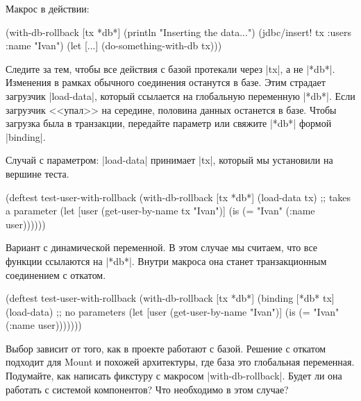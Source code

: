 \noindent
Макрос в действии:

\begin{english}
  \begin{clojure}
(with-db-rollback [tx *db*]
  (println "Inserting the data...")
  (jdbc/insert! tx :users {:name "Ivan"})
  (let [...]
    (do-something-with-db tx)))
  \end{clojure}
\end{english}

Следите за тем, чтобы все действия с базой протекали через \spverb|tx|, а не
\spverb|*db*|. Изменения в рамках обычного соединения останутся в базе. Этим
страдает загрузчик \spverb|load-data|, который ссылается на глобальную
переменную \spverb|*db*|. Если загрузчик <<упал>> на середине, половина данных
останется в базе. Чтобы загрузка была в транзакции, передайте параметр или
свяжите \spverb|*db*| формой \spverb|binding|.

Случай с параметром: \spverb|load-data| принимает \spverb|tx|, который мы
установили на вершине теста.

\begin{english}
  \begin{clojure}
(deftest test-user-with-rollback
  (with-db-rollback [tx *db*]
    (load-data tx) ;; takes a parameter
    (let [user (get-user-by-name tx "Ivan")]
      (is (= "Ivan" (:name user))))))
  \end{clojure}
\end{english}


Вариант с динамической переменной. В этом случае мы считаем, что все функции
ссылаются на \spverb|*db*|. Внутри макроса она станет транзакционным соединением
с откатом.

\begin{english}
  \begin{clojure}
(deftest test-user-with-rollback
  (with-db-rollback [tx *db*]
    (binding [*db* tx]
      (load-data) ;; no parameters
      (let [user (get-user-by-name "Ivan")]
        (is (= "Ivan" (:name user)))))))
  \end{clojure}
\end{english}

Выбор зависит от того, как в проекте работают с базой. Решение с откатом
подходит для Mount и похожей архитектуры, где база это глобальная
переменная. Подумайте, как написать фикстуру с макросом
\spverb|with-db-rollback|. Будет ли она работать с системой компонентов? Что
необходимо в этом случае?

